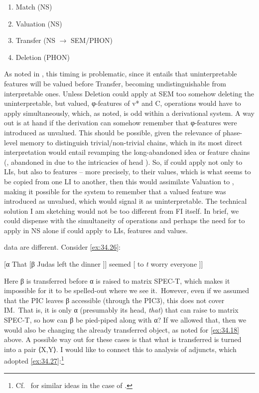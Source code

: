 \documentclass[output=paper]{langsci/langscibook}
\begin{document}
\ea%
    \label{ex:34.25}
    \begin{enumerate}
        \item Match (\gls{NS})\\
        \item Valuation (\gls{NS})\\
        \item Transfer (\gls{NS} ${\rightarrow}$ SEM/PHON)\\
        \item Deletion (PHON)\\
    \end{enumerate}
\z

As noted in \citet{EpSee2002}, this timing is problematic, since it entails that
uninterpretable features will be valued before Transfer, becoming
undistinguishable from interpretable ones. Unless Deletion could apply at S\gls{EM}
too somehow deleting the uninterpretable, but valued, φ-features of v* and C,
operations would have to apply simultaneously, which, as noted, is odd within a
derivational system. A way out is at hand if the derivation can somehow
remember that φ-features were introduced as unvalued. This should be possible,
given the relevance of phase-level memory to distinguish trivial\slash non-trivial
chains, which in its most direct interpretation would entail revamping the
long-abandoned idea or feature chains (\cites[262, 270--271, 383, fn.\
27]{Chomsky1995}, abandoned in \citealt{Chomsky2000} due to the intricacies of
head \isi{movement}). So, if \isi{Merge} could apply not only to LIs, but also to
features -- more precisely, to their values, which is what seems to be copied from
one LI to another, then this would assimilate Valuation to \isi{Merge}, making it
possible for the system to remember that a valued feature was introduced as
unvalued, which would signal it as uninterpretable. The technical solution I am
sketching would not be too different from \gls{FI} itself. In brief, we could
dispense with the simultaneity of operations and perhaps the need for  to
apply in \gls{NS} alone if \isi{Merge} could apply to LIs, features and values.

 data are different. Consider \eqref{ex:34.26}:

\ea%
    \label{ex:34.26}
    [α That [β Judas left the dinner ]] seemed [ to \emph{t} worry everyone ]]
\z

Here β is transferred before α is raised to matrix SPEC-T,
which makes it impossible for it to be spelled-out where we see it.~However,
even if we assumed that the \gls{PIC} leaves β accessible (through the PIC3),
this does not cover \gls{IM}.~That is, it is only α (presumably its head,
\emph{that}) that can raise to matrix SPEC-T, so how can β be
pied-piped along with α? If we allowed that, then we would also be
changing the already transferred object, as noted for \eqref{ex:34.18} above. A possible
way out for these cases is that what is transferred is turned into a pair
⟨X,Y⟩. I would like to connect this to \citegen{Chomsky2004} analysis of adjuncts,
which adopted \eqref{ex:34.27}:\footnote{Cf.~\citet[139]{Chomsky2008} for similar ideas
    in the case of \isi{Merge}.}
\end{document}
